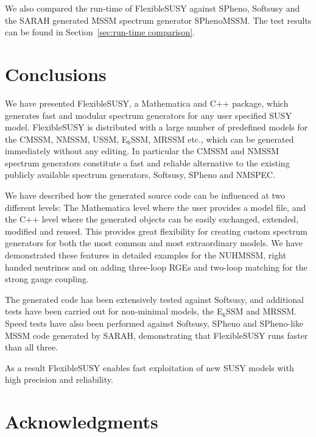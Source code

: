 \documentclass[final,3p,11pt,pdflatex]{elsarticle}
\makeatletter
\newcommand{\fs}{FlexibleSUSY\@\xspace}
\newcommand{\mathematica}{Mathematica\xspace}
\newcommand{\ESSM}{E$_6$SSM\@\xspace}
\newcommand{\secref}[1]{Section~\ref{#1}}
\makeatother
\begin{document}
We also compared the run-time of \fs against SPheno, Softsusy and the
SARAH generated MSSM spectrum generator SPhenoMSSM.  The test results
can be found in \secref{sec:run-time comparison}.

\section{Conclusions}

We have presented \fs, a Mathematica and C++ package, which generates fast and
modular spectrum generators for any user specified SUSY model.  \fs is
distributed with a large number of predefined models for the CMSSM,
NMSSM, USSM, \ESSM, MRSSM etc., which can be generated immediately
without any editing.  In particular the CMSSM and NMSSM spectrum
generators constitute a fast and reliable alternative to the existing
publicly available spectrum generators, Softsusy, SPheno and
NMSPEC. 

We have described how the generated source code can be influenced at
two different levels: The \mathematica level where the user provides a
model file, and the C++ level where the generated objects can be
easily exchanged, extended, modified and reused.  This provides great
flexibility for creating custom spectrum generators for both the most
common and most extraordinary models.  We have demonstrated these
features in detailed examples for the NUHMSSM, right handed neutrinos
and on adding three-loop RGEs and two-loop matching for the strong
gauge coupling.  

The generated code has been extensively tested against Softsusy, and
additional tests have been carried out for non-minimal models, the
\ESSM and MRSSM.  Speed tests have also been performed against
Softsusy, SPheno and SPheno-like MSSM code generated by SARAH,
demonstrating that \fs runs faster than all three.

As a result \fs enables fast exploitation of new SUSY models with high
precision and reliability.

\section*{Acknowledgments}
\end{document}
